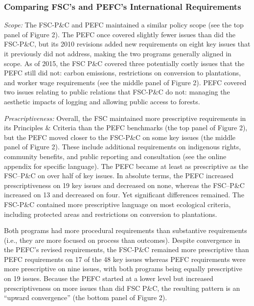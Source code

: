 \documentclass[
      12pt,
            Review ]{article}
\begin{document}
\hypertarget{comparing-fscs-and-pefcs-international-requirements}{%
\subsubsection{Comparing FSC's and PEFC's International Requirements}\label{comparing-fscs-and-pefcs-international-requirements}}

\emph{Scope:} The FSC-P\&C and PEFC maintained a similar policy scope (see the top panel of Figure 2). The PEFC once covered slightly fewer issues than did the FSC-P\&C, but its 2010 revisions added new requirements on eight key issues that it previously did not address, making the two programs generally aligned in scope. As of 2015, the FSC P\&C covered three potentially costly issues that the PEFC still did not: carbon emissions, restrictions on conversion to plantations, and worker wage requirements (see the middle panel of Figure 2). PEFC covered two issues relating to public relations that FSC-P\&C do not: managing the aesthetic impacts of logging and allowing public access to forests.

\emph{Prescriptiveness:} Overall, the FSC maintained more prescriptive requirements in its Principles \& Criteria than the PEFC benchmarks (the top panel of Figure 2), but the PEFC moved closer to the FSC-P\&C on some key issues (the middle panel of Figure 2). These include additional requirements on indigenous rights, community benefits, and public reporting and consultation (see the online appendix for specific language). The PEFC became at least as prescriptive as the FSC--P\&C on over half of key issues. In absolute terms, the PEFC increased prescriptiveness on 19 key issues and decreased on none, whereas the FSC--P\&C increased on 13 and decreased on four. Yet significant differences remained. The FSC-P\&C contained more prescriptive language on most ecological criteria, including protected areas and restrictions on conversion to plantations.

Both programs had more procedural requirements than substantive requirements (i.e., they are more focused on process than outcomes). Despite convergence in the PEFC's revised requirements, the FSC-P\&C remained more prescriptive than PEFC requirements on 17 of the 48 key issues whereas PEFC requirements were more prescriptive on nine issues, with both programs being equally prescriptive on 19 issues. Because the PEFC started at a lower level but increased prescriptiveness on more issues than did FSC P\&C, the resulting pattern is an ``upward convergence'' (the bottom panel of Figure 2).
\end{document}
